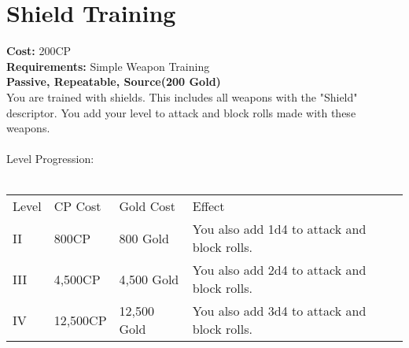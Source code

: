 \section{Shield Training}\label{perk:shieldTraining}
\textbf{Cost:} 200CP\\
\textbf{Requirements:} Simple Weapon Training\\
\textbf{Passive, Repeatable, Source(200 Gold)}\\
You are trained with shields.
This includes all weapons with the "Shield" descriptor.
You add your level to attack and block rolls made with these weapons.\\
\\
Level Progression:\\
\\
\begin{tabular}{l | l | l | l}
	Level & CP Cost & Gold Cost & Effect\\
	II & 800CP & 800 Gold & You also add 1d4 to attack and block rolls.\\
	III & 4,500CP & 4,500 Gold & You also add 2d4 to attack and block rolls.\\
	IV & 12,500CP & 12,500 Gold & You also add 3d4 to attack and block rolls.\\
\end{tabular}